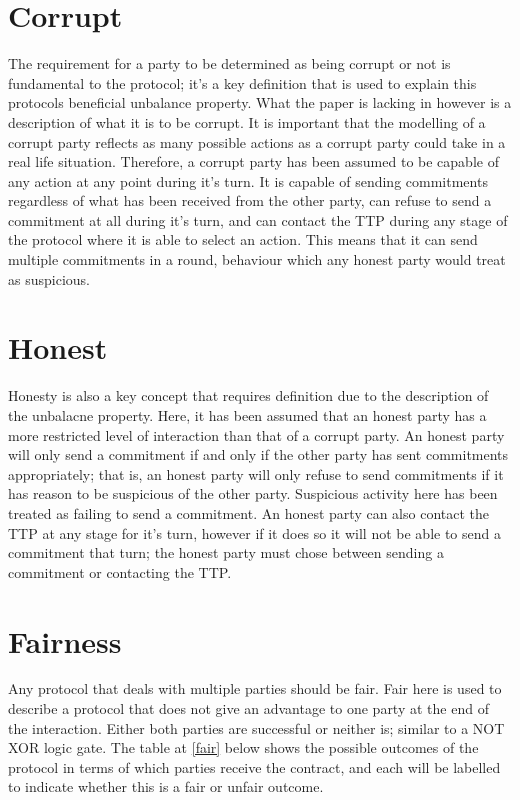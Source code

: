 \documentclass{l4proj}
\begin{document}
\section{Corrupt}

The requirement for a party to be determined as being corrupt or not is fundamental to the protocol; it's a key definition that is used to explain this protocols beneficial unbalance property. What the paper is lacking in however is a description of what it is to be corrupt. It is important that the modelling of a corrupt party reflects as many possible actions as a corrupt party could take in a real life situation. Therefore, a corrupt party has been assumed to be capable of any action at any point during it's turn. It is capable of sending commitments regardless of what has been received from the other party, can refuse to send a commitment at all during it's turn, and can contact the TTP during any stage of the protocol where it is able to select an action. This means that it can send multiple commitments in a round, behaviour which any honest party would treat as suspicious.

\section{Honest}

Honesty is also a key concept that requires definition due to the description of the unbalacne property. Here, it has been assumed that an honest party has a more restricted level of interaction than that of a corrupt party. An honest party will only send a commitment if and only if the other party has sent commitments appropriately; that is, an honest party will only refuse to send commitments if it has reason to be suspicious of the other party. Suspicious activity here has been treated as failing to send a commitment. An honest party can also contact the TTP at any stage for it's turn, however if it does so it will not be able to send a commitment that turn; the honest party must chose between sending a commitment or contacting the TTP.

\section{Fairness}

Any protocol that deals with multiple parties should be fair. Fair here is used to describe a protocol that does not give an advantage to one party at the end of the interaction. Either both parties are successful or neither is; similar to a NOT XOR logic gate. The table at \ref{fair} below shows the possible outcomes of the protocol in terms of which parties receive the contract, and each will be labelled to indicate whether this is a fair or unfair outcome.
\end{document}
